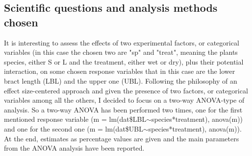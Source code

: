 \documentclass{article}
\begin{document}
\subsection{Scientific questions and analysis methods chosen}
It is interesting to assess the effects of two experimental factors, or categorical variables (in this case the chosen two are "sp" and "treat", meaning the plants species, either S or L and the treatment, either wet or dry), plus their potential interaction, on some chosen response variables that in this case are the lower bract length (LBL) and the upper one (UBL).
Following the philosophy of an effect size-centered approach and given the presence of two factors, or categorical variables among all the others, I decided to focus on a two-way ANOVA-type of analysis. So a two-way ANOVA has been performed two times, one for the first mentioned response variable (m = lm(dat\$LBL$\sim$species*treatment),
anova(m)) and one for the second one (m = lm(dat\$UBL$\sim$species*treatment),
anova(m)). At the end, estimates as percentage values are given and the main parameters from the ANOVA analysis have been reported.
\end{document}
